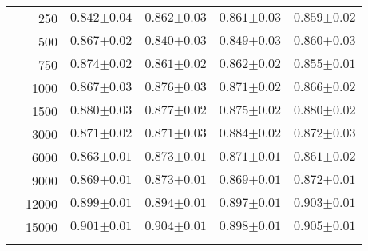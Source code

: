 \begin{table}[p]
\begin{tabularx}{0.65\textwidth}{cr| *{4}{Y}}
        & 250 & $0.842{\scriptscriptstyle\pm0.04}$ & $0.862{\scriptscriptstyle\pm0.03}$ & $0.861{\scriptscriptstyle\pm0.03}$ & $0.859{\scriptscriptstyle\pm0.02}$ \\
        & 500 & $0.867{\scriptscriptstyle\pm0.02}$ & $0.840{\scriptscriptstyle\pm0.03}$ & $0.849{\scriptscriptstyle\pm0.03}$ & $0.860{\scriptscriptstyle\pm0.03}$ \\
        & 750 & $0.874{\scriptscriptstyle\pm0.02}$ & $0.861{\scriptscriptstyle\pm0.02}$ & $0.862{\scriptscriptstyle\pm0.02}$ & $0.855{\scriptscriptstyle\pm0.01}$ \\
        & 1000 & $0.867{\scriptscriptstyle\pm0.03}$ & $0.876{\scriptscriptstyle\pm0.03}$ & $0.871{\scriptscriptstyle\pm0.02}$ & $0.866{\scriptscriptstyle\pm0.02}$ \\
        & 1500 & $0.880{\scriptscriptstyle\pm0.03}$ & $0.877{\scriptscriptstyle\pm0.02}$ & $0.875{\scriptscriptstyle\pm0.02}$ & $0.880{\scriptscriptstyle\pm0.02}$ \\
        & 3000 & $0.871{\scriptscriptstyle\pm0.02}$ & $0.871{\scriptscriptstyle\pm0.03}$ & $0.884{\scriptscriptstyle\pm0.02}$ & $0.872{\scriptscriptstyle\pm0.03}$ \\
        & 6000 & $0.863{\scriptscriptstyle\pm0.01}$ & $0.873{\scriptscriptstyle\pm0.01}$ & $0.871{\scriptscriptstyle\pm0.01}$ & $0.861{\scriptscriptstyle\pm0.02}$ \\
        & 9000 & $0.869{\scriptscriptstyle\pm0.01}$ & $0.873{\scriptscriptstyle\pm0.01}$ & $0.869{\scriptscriptstyle\pm0.01}$ & $0.872{\scriptscriptstyle\pm0.01}$ \\
        & 12000 & $0.899{\scriptscriptstyle\pm0.01}$ & $0.894{\scriptscriptstyle\pm0.01}$ & $0.897{\scriptscriptstyle\pm0.01}$ & $0.903{\scriptscriptstyle\pm0.01}$ \\
        & 15000 & $0.901{\scriptscriptstyle\pm0.01}$ & $0.904{\scriptscriptstyle\pm0.01}$ & $0.898{\scriptscriptstyle\pm0.01}$ & $0.905{\scriptscriptstyle\pm0.01}$ \\
    \end{tabularx}
\end{table}


